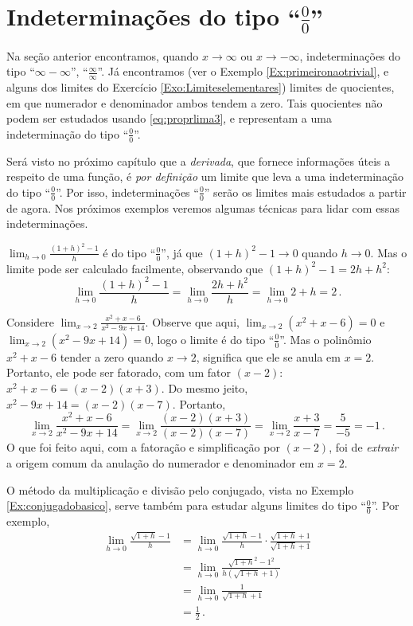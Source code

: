 \section{Indeterminações do tipo ``$\tfrac00$''}
Na seção anterior encontramos, quando $x\to \infty$ ou $x\to -\infty$, indeterminações do
tipo ``$\infty-\infty$'', ``$\frac{\infty}{\infty}$''.
Já encontramos (ver o Exemplo \ref{Ex:primeironaotrivial}, e alguns 
dos limites do Exercício \ref{Exo:Limiteselementares}) 
limites de quocientes, em que numerador e denominador ambos 
tendem a zero. Tais quocientes não podem ser estudados 
usando \eqref{eq:proprlima3}, e representam a uma {indeterminação
do tipo ``$\tfrac{0}{0}$''}.

Será visto no próximo capítulo que a \emph{derivada}, que 
fornece informações úteis a respeito de uma função, é \emph{por definição} 
um limite que leva a uma indeterminação do tipo ``$\tfrac{0}{0}$''. Por isso, indeterminações ``$\frac00$''
serão os limites mais estudados a partir de agora.
Nos próximos exemplos veremos algumas técnicas para lidar com essas
indeterminações.

\begin{ex}\label{Ex:derivxissdoisemum}
$\lim_{h\to 0}\frac{(1+h)^2-1}{h}$ é do tipo ``$\frac00$'', já 
que $(1+h)^2-1\to 0$ quando $h\to 0$.
Mas o limite pode ser calculado facilmente, observando 
que $(1+h)^2-1=2h+h^2$:
$$
\lim_{h\to 0}\frac{(1+h)^2-1}{h}=\lim_{h\to 0}
\frac{2h+h^2}{h}=\lim_{h\to 0}2+h=2\,.
$$
\end{ex}

\begin{ex}
Considere $\lim_{x \to 2}\frac{x^2+x-6}{x^2-9x+14}$.
Observe que aqui, $\lim_{x \to 2}(x^2+x-6)=0$ e 
$\lim_{x \to 2}(x^2-9x+14)=0$, logo o limite é do tipo ``$\tfrac00$''.
Mas o polinômio $x^2+x-6$ tender a zero quando $x\to 2$, significa que 
ele se anula em $x=2$. Portanto, ele pode ser fatorado, com
um fator $(x-2)$:
$x^2+x-6=(x-2)(x+3)$. Do mesmo jeito,
$x^2-9x+14=(x-2)(x-7)$. Portanto,
$$
\lim_{x \to 2}\frac{x^2+x-6}{x^2-9x+14}=\lim_{x \to 2}\frac{(x-2)(x+3)}{(x-2)(x-7)}
=\lim_{x \to 2}\frac{x+3}{x-7}=\frac{5}{-5}=-1\,.
$$
O que foi feito aqui, com a fatoração e simplificação 
por $(x-2)$, foi de \emph{extrair} a origem comum da 
anulação do
numerador e denominador em $x=2$.
\end{ex}

\begin{ex}
O método da multiplicação e divisão pelo conjugado, 
vista no Exemplo \ref{Ex:conjugadobasico}, serve também 
para estudar
alguns limites do tipo ``$\frac00$''.
Por exemplo,
\begin{align*}\lim_{h\to 0}\frac{\sqrt{1+h}-1}{h}
&=\lim_{h\to 0}
\frac{\sqrt{1+h}-1}{h}\cdot\frac{\sqrt{1+h}+1}{\sqrt{1+h}+1}\\
&=\lim_{h\to 0}
\frac{\sqrt{1+h}^2-1^2}{h(\sqrt{1+h}+1)}\\
&=\lim_{
h\to 0}\frac{1}{\sqrt{1+h}+1}\\
&=\frac{1}{2}\,.
\end{align*}
\end{ex}

